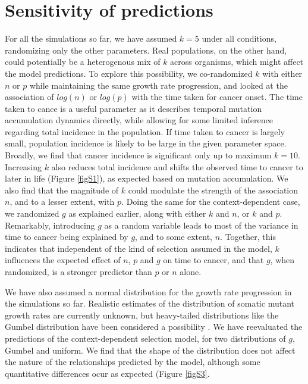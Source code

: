 \documentclass[9pt,twocolumn,twoside]{pnas-new}
\begin{document}
\section*{Sensitivity of predictions}
For all the simulations so far, we have assumed $k=5$ under all conditions, randomizing only the other parameters. Real populations, on the other hand, could potentially be a heterogenous mix of $k$ across organisms, which might affect the model predictions. To explore this possibility, we co-randomized $k$ with either $n$ or $p$ while maintaining the same growth rate progression, and looked at the association of $log(n)$ or $log(p)$ with the time taken for cancer onset. The time taken to cance is a useful parameter as it describes temporal mutation accumulation dynamics directly, while allowing for some limited inference regarding total incidence in the population. If time taken to cancer is largely small, population incidence is likely to be large in the given parameter space.
Broadly, we find that cancer incidence is significant only up to maximum $k=10$. Increasing $k$ also reduces total incidence and shifts the observed time to cancer to later in life (Figure \ref{figS1}), as expected based on mutation accumulation. We also find that the magnitude of $k$ could modulate the strength of the association $n$, and to a lesser extent, with $p$. Doing the same for the context-dependent case, we randomized $g$ as explained earlier, along with either $k$ and $n$, or $k$ and $p$. Remarkably, introducing $g$ as a random variable leads to most of the variance in time to cancer being explained by $g$, and to some extent, $n$. Together, this indicates that independent of the kind of selection assumed in the model, $k$ influences the expected effect of $n$, $p$ and $g$ on time to cancer, and that $g$, when randomized, is a stronger predictor than $p$ or $n$ alone.

We have also assumed a normal distribution for the growth rate progression in the simulations so far. Realistic estimates of the distribution of somatic mutant growth rates are currently unknown, but heavy-tailed distributions like the Gumbel distribution have been considered a possibility \cite{Durrett2010}. We have reevaluated the predictions of the context-dependent selection model, for two distributions of $g$, Gumbel and uniform. We find that the shape of the distribution does not affect the nature of the relationships predicted by the model, although some quantitative differences ocur as expected (Figure \ref{figS3}.
\end{document}
